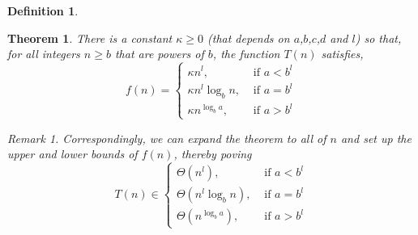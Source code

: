 \documentclass[11pt]{article}
\theoremstyle{plain}%
\newtheorem{theorem}{Theorem}[section]
\theoremstyle{definition}
\newtheorem{defn}{Definition}
\theoremstyle{remark}
\newtheorem*{rem}{Remark}
\begin{document}
\begin{defn}
  \begin{theorem}
    \label{maste theorem}
    There is a constant $\kappa \geq 0$ (that depends on $a$,$b$,$c$,$d$ and $l$) so that, for all integers $n \geq b$ that are powers of $b$, the function $T(n)$ satisfies,
    \begin{equation*}
      f(n)=
      \begin{cases}
        \kappa n^l, & \text{ if } a< b^l\\
        \kappa n^l \log_b{n}, & \text{ if } a=b^l\\
        \kappa n^{\log_b{a}}, & \text{ if } a> b^l
      \end{cases}
    \end{equation*}
    \begin{rem}
      Correspondingly, we can expand the theorem to all of $n$ and set up the upper and lower bounds of $f(n)$, thereby poving
      \begin{equation*}
        T(n)\in
        \begin{cases}
          \Theta(n^l), & \text{ if } a< b^l\\
          \Theta(n^l \log_b{n}), & \text{ if } a=b^l\\
          \Theta(n^{\log_b{a}}), & \text{ if } a> b^l
        \end{cases}
      \end{equation*}
    \end{rem}
  \end{theorem}


\end{defn}
\end{document}
